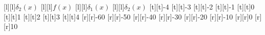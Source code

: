 %    
%
%
\begin{psfrags}%
\psfragscanon%
%
[l][l]{$\delta_2(x)$}%
[l][l]{$f(x)$}%
[l][l]{$\delta_1(x)$}%
[l][l]{$\delta_2(x)$}%
%
[t][t]{-4}%
[t][t]{-3}%
[t][t]{-2}%
[t][t]{-1}%
[t][t]{0}%
[t][t]{1}%
[t][t]{2}%
[t][t]{3}%
[t][t]{4}%
%
[r][r]{-60}%
[r][r]{-50}%
[r][r]{-40}%
[r][r]{-30}%
[r][r]{-20}%
[r][r]{-10}%
[r][r]{0}%
[r][r]{10}%
%
%
\end{psfrags}%
%

